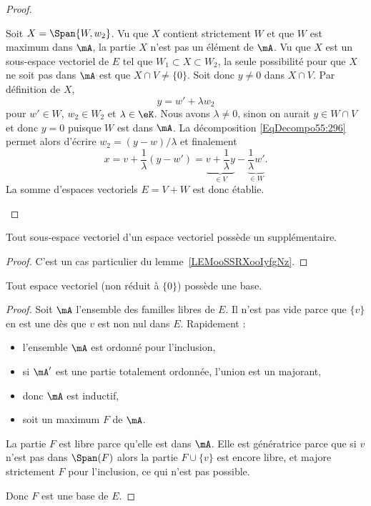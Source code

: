 \begin{proof}
\begin{subproof}
            Soit \( X=\Span\{ W,w_2 \}\). Vu que \( X\) contient strictement \( W\) et que \( W\) est maximum dans \( \mA\), la partie \( X\) n'est pas un élément de \( \mA\). Vu que \( X\) est un sous-espace vectoriel de \( E\) tel que \( W_1\subset X\subset W_2\), la seule possibilité pour que \( X\) ne soit pas dans \( \mA\) est que \( X\cap V\neq \{ 0 \}\). Soit donc \( y\neq 0\) dans \( X\cap V\). Par définition de \( X\),
            \begin{equation}\label{EqDecompo55:296}
                y=w'+\lambda w_2
            \end{equation}
            pour \( w'\in W\), \( w_2\in W_2\) et \( \lambda\in \eK\). Nous avons \( \lambda\neq 0\), sinon on aurait \( y\in W\cap V \) et donc \(y = 0 \) puisque \( W \) est dans \( \mA \). La décomposition \eqref{EqDecompo55:296} permet alors d'écrire \( w_2=(y-w)/\lambda\) et finalement
            \begin{equation}
                x=v+\frac{1}{ \lambda }(y-w')=\underbrace{v+\frac{1}{ \lambda }y}_{\in V}-\underbrace{\frac{1}{ \lambda }w'}_{\in W}.
            \end{equation}
            La somme d'espaces vectoriels \( E=V+W\) est donc établie.
    \end{subproof}
\end{proof}

\begin{corollary}
    Tout sous-espace vectoriel d'un espace vectoriel possède un supplémentaire.
\end{corollary}

\begin{proof}
    C'est un cas particulier du lemme~\ref{LEMooSSRXooIyfgNz}.
\end{proof}

\begin{proposition}
    Tout espace vectoriel (non réduit à \( \{ 0 \}\)) possède une base.
\end{proposition}

\begin{proof}
    Soit \( \mA\) l'ensemble des familles libres de \( E\). Il n'est pas vide parce que \( \{ v \}\) en est une dès que \( v\) est non nul dans \( E\). Rapidement :
    \begin{itemize}
        \item l'ensemble \( \mA\) est ordonné pour l'inclusion,
        \item si \( \mA'\) est une partie totalement ordonnée, l'union est un majorant,
        \item donc \( \mA\) est inductif,
        \item soit un maximum \( F\) de \( \mA\).
    \end{itemize}
    La partie \( F\) est libre parce qu'elle est dans \( \mA\). Elle est génératrice parce que si \( v\) n'est pas dans \( \Span(F)\) alors la partie \( F\cup\{ v \}\) est encore libre, et majore strictement $F$ pour l'inclusion, ce qui n'est pas possible.

    Donc \( F\) est une base de \( E\).
\end{proof}

